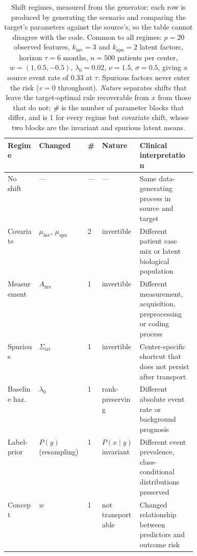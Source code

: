 \begin{table}[t]
\caption{Shift regimes, measured from the generator: each row is produced by generating the scenario and comparing the target's parameters against the source's, so the table cannot disagree with the code. Common to all regimes: $p{=}20$ observed features, $k_{\mathrm{inv}}{=}3$ and $k_{\mathrm{spu}}{=}2$ latent factors, horizon $\tau{=}6$ months, $n{=}500$ patients per center, $w{=}(1, 0.5, -0.5)$, $\lambda_0{=}0.02$, $\nu{=}1.5$, $\sigma{=}0.5$, giving a source event rate of $0.33$ at $\tau$. Spurious factors never enter the risk ($v{=}0$ throughout). \emph{Nature} separates shifts that leave the target-optimal rule recoverable from $x$ from those that do not; \emph{\#} is the number of parameter blocks that differ, and is 1 for every regime but covariate shift, whose two blocks are the invariant and spurious latent means.}
\label{tab:scenarios}
\centering
\footnotesize
\setlength{\tabcolsep}{4pt}
\begin{tabular}{@{}lllp{0.13\linewidth}p{0.30\linewidth}@{}}
\toprule
\textbf{Regime} & \textbf{Changed} & \textbf{\#} & \textbf{Nature} & \textbf{Clinical interpretation} \\
\midrule
No shift & --- & --- & --- & Same data-generating process in source and target \\
Covariate & $\mu_{\mathrm{inv}}$, $\mu_{\mathrm{spu}}$ & 2 & invertible & Different patient case mix or latent biological population \\
Measurement & $A_{\mathrm{inv}}$ & 1 & invertible & Different measurement, acquisition, preprocessing or coding process \\
Spurious & $\Sigma_{\mathrm{lat}}$ & 1 & invertible & Center-specific shortcut that does not persist after transport \\
Baseline haz. & $\lambda_0$ & 1 & rank-preserving & Different absolute event rate or background prognosis \\
Label-prior & $P(y)$ (resampling) & 1 & $P(x\mid y)$ invariant & Different event prevalence, class-conditional distributions preserved \\
Concept & $w$ & 1 & not transportable & Changed relationship between predictors and outcome risk \\
\bottomrule
\end{tabular}
\end{table}
